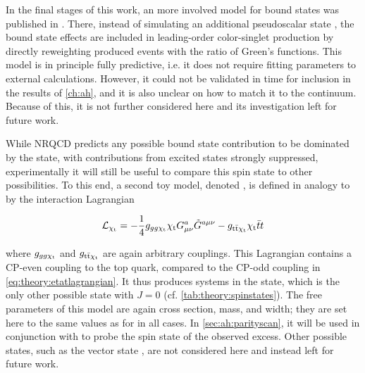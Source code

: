 In the final stages of this work, an more involved model for \ttbar bound states was published in . There, instead of simulating an additional pseudoscalar state \etat, the bound state effects are included in leading-order color-singlet \ttbar production by directly reweighting produced events with the ratio of Green's functions. This model is in principle fully predictive, i.e. it does not require fitting parameters to external calculations. However, it could not be validated in time for inclusion in the results of \cref{ch:ah}, and it is also unclear on how to match it to the \ttbar continuum. Because of this, it is not further considered here and its investigation left for future work.

While NRQCD predicts any possible \ttbar bound state contribution to be dominated by the  state, with contributions from excited states strongly suppressed, experimentally it will still be useful to compare this spin state to other possibilities. To this end, a second toy model, denoted \chit, is defined in analogy to \etat by the interaction Lagrangian

\begin{equation}
  \mathcal{L}_{\mathrm{\chi_t}} = - \frac{1}{4} g_{gg \mathrm{\chi_t}} \mathrm{\chi_t} G^{a}_{\mu \nu} \tilde{G}^{a \mu \nu} - g_{\mathrm{t \bar{t}} \mathrm{\chi_t}} \mathrm{\chi_t} \bar{t} t
\end{equation}

\noindent where $g_{gg \mathrm{\chi_t}}$ and $g_{\mathrm{t \bar{t}} \mathrm{\chi_t}}$ are again arbitrary couplings. This Lagrangian contains a CP-even coupling to the top quark, compared to the CP-odd coupling in \cref{eq:theory:etatlagrangian}. It thus produces \ttbar systems in the  state, which is the only other possible state with $J = 0$ (cf. \cref{tab:theory:spinstates}). The free parameters of this model are again cross section, mass, and width; they are set here to the same values as for \etat in all cases. In \cref{sec:ah:parityscan}, it will be used in conjunction with \etat to probe the spin state of the observed excess. Other possible states, such as the vector state , are not considered here and instead left for future work.

